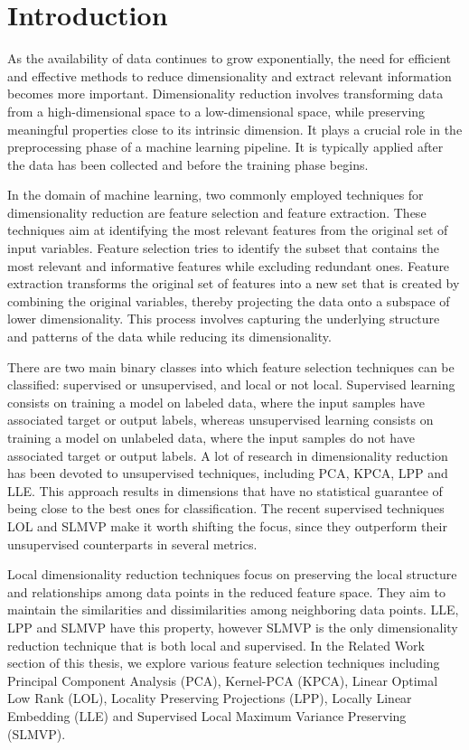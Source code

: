 \chapter{Introduction}

As the availability of data continues to grow exponentially, the need for efficient and effective methods to reduce dimensionality and extract relevant information becomes more important.
Dimensionality reduction involves transforming data from a high-dimensional space to a low-dimensional space, while preserving meaningful properties close to its intrinsic dimension. It plays a crucial role in the preprocessing phase of a machine learning pipeline. It is typically applied after the data has been collected and before the training phase begins.

In the domain of machine learning, two commonly employed techniques for dimensionality reduction are feature selection and feature extraction. These techniques aim at identifying the most relevant features from the original set of input variables.
Feature selection tries to identify the subset that contains the most relevant and informative features while excluding redundant ones.
Feature extraction transforms the original set of features into a new set that is created by combining the original variables, thereby projecting the data onto a subspace of lower dimensionality. This process involves capturing the underlying structure and patterns of the data while reducing its dimensionality.

There are two main binary classes into which feature selection techniques can be classified: supervised or unsupervised, and local or not local.
Supervised learning consists on training a model on labeled data, where the input samples have associated target or output labels, whereas unsupervised learning consists on training a model on unlabeled data, where the input samples do not have associated target or output labels. A lot of research in dimensionality reduction has been devoted to unsupervised techniques, including PCA, KPCA, LPP and LLE. This approach results in dimensions that have no statistical guarantee of being close to the best ones for classification. The recent supervised techniques LOL and SLMVP make it worth shifting the focus, since they outperform their unsupervised counterparts in several metrics.

Local dimensionality reduction techniques focus on preserving the local structure and relationships among data points in the reduced feature space. They aim to maintain the similarities and dissimilarities among neighboring data points. LLE, LPP and SLMVP have this property, however SLMVP is the only dimensionality reduction technique that is both local and supervised.
In the Related Work section of this thesis, we explore various feature selection techniques including Principal Component Analysis \cite{pca} (PCA), Kernel-PCA \cite{kpca} (KPCA), Linear Optimal Low Rank \cite{lol} (LOL), Locality Preserving Projections \cite{lpp} (LPP), Locally Linear Embedding \cite{lle} (LLE) and Supervised Local Maximum Variance Preserving \cite{slmvp} (SLMVP).

